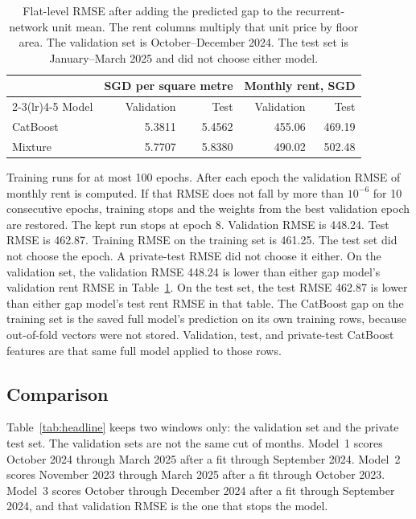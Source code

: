 \documentclass[11pt,a4paper]{article}
\begin{document}
\begin{table}[htbp]
\centering
\caption{Flat-level RMSE after adding the predicted gap to the recurrent-network unit mean.
The rent columns multiply that unit price by floor area.
The validation set is October--December 2024.
The test set is January--March 2025 and did not choose either model.}
\label{tab:gap}
\small
\setlength{\tabcolsep}{5pt}
\begin{tabular}{lrrrr}
\toprule
 & \multicolumn{2}{c}{SGD per square metre} & \multicolumn{2}{c}{Monthly rent, SGD} \\
\cmidrule(lr){2-3}\cmidrule(lr){4-5}
Model & Validation & Test & Validation & Test \\
\midrule
CatBoost & 5.3811 & 5.4562 & 455.06 & 469.19 \\
Mixture & 5.7707 & 5.8380 & 490.02 & 502.48 \\
\bottomrule
\end{tabular}
\end{table}

Training runs for at most 100 epochs.
After each epoch the validation RMSE of monthly rent is computed.
If that RMSE does not fall by more than \(10^{-6}\) for 10 consecutive epochs, training stops and the weights from the best validation epoch are restored.
The kept run stops at epoch 8.
Validation RMSE is 448.24.
Test RMSE is 462.87.
Training RMSE on the training set is 461.25.
The test set did not choose the epoch.
A private-test RMSE did not choose it either.
On the validation set, the validation RMSE 448.24 is lower than either gap model's validation rent RMSE in Table~\ref{tab:gap}.
On the test set, the test RMSE 462.87 is lower than either gap model's test rent RMSE in that table.
The CatBoost gap on the training set is the saved full model's prediction on its own training rows, because out-of-fold vectors were not stored.
Validation, test, and private-test CatBoost features are that same full model applied to those rows.

\subsection{Comparison}
\label{sec:headline}

Table~\ref{tab:headline} keeps two windows only: the validation set and the private test set.
The validation sets are not the same cut of months.
Model~1 scores October 2024 through March 2025 after a fit through September 2024.
Model~2 scores November 2023 through March 2025 after a fit through October 2023.
Model~3 scores October through December 2024 after a fit through September 2024, and that validation RMSE is the one that stops the model.
\end{document}

